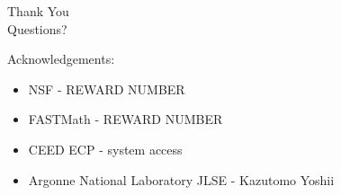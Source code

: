 \documentclass{beamer}
\begin{document}
\begin{frame}
  \begin{center}
    {\huge
      Thank You\\
      \bigskip
      \bigskip
      \bigskip
      \bigskip
      \bigskip
      \huge
      Questions?\\
      \bigskip
      \bigskip
      \bigskip
    }
  \end{center}
  \large
  Acknowledgements:\\
  \begin{itemize}
    \item NSF - REWARD NUMBER
    \item FASTMath - REWARD NUMBER
    \item CEED ECP - system access
    \item Argonne National Laboratory JLSE - Kazutomo Yoshii
  \end{itemize}
\end{frame}
\end{document}
